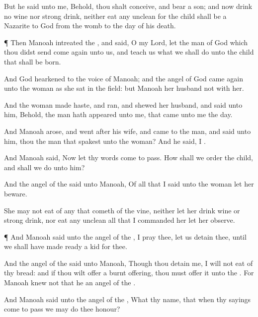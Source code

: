 {But he
said unto me, Behold, thou shalt
conceive, and
bear a
son; and now
drink no
wine nor strong
drink, neither
eat any
unclean
{} for the
child shall be a
Nazarite to
God from the
womb to the
day of his
death.


\par }{\PP {}¶ Then
Manoah
intreated the
{}, and
said,
O my
Lord,
let the
man of
God which thou didst
send come
again unto us, and
teach us what we shall
do unto the
child that shall be
born.

And
God
hearkened to the
voice of
Manoah; and the
angel of
God came
again unto the
woman as she
sat in the
field: but
Manoah her
husband
{} not with her.

And the
woman made
haste, and
ran, and
shewed her
husband, and
said unto him, Behold, the
man hath
appeared unto me, that
came unto me the
{}
day.

And
Manoah
arose, and
went
after his
wife, and
came to the
man, and
said unto him,
{} thou the
man that
spakest unto the
woman? And he
said, I
{}.

And
Manoah
said, Now let thy
words come to
pass. How shall we
order the
child, and
{} shall we
do unto him?

And the
angel of the
{}
said unto
Manoah, Of all that I
said unto the
woman let her
beware.

She may not
eat of any
{} that
cometh of the
vine, neither let her
drink
wine or strong
drink, nor
eat any
unclean
{} all that I
commanded her let her
observe.


\par }{\PP {}¶ And
Manoah
said unto the
angel of the
{}, I pray thee, let us
detain thee, until we shall have made
ready a
kid
for thee.

And the
angel of the
{}
said unto
Manoah, Though thou
detain me, I will not
eat of thy
bread: and
if thou wilt
offer a burnt
offering, thou must
offer it unto the
{}. For
Manoah
knew not that he
{} an
angel of the
{}.

And
Manoah
said unto the
angel of the
{}, What
{} thy
name, that when thy
sayings come to
pass we may do thee
honour?

}
